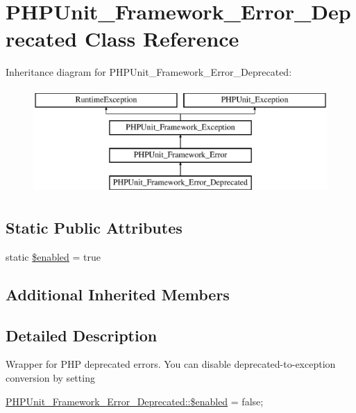\hypertarget{class_p_h_p_unit___framework___error___deprecated}{}\section{P\+H\+P\+Unit\+\_\+\+Framework\+\_\+\+Error\+\_\+\+Deprecated Class Reference}
\label{class_p_h_p_unit___framework___error___deprecated}
Inheritance diagram for P\+H\+P\+Unit\+\_\+\+Framework\+\_\+\+Error\+\_\+\+Deprecated\+:\begin{figure}[H]
\begin{center}
\leavevmode
\includegraphics[height=4.000000cm]{class_p_h_p_unit___framework___error___deprecated}
\end{center}
\end{figure}
\subsection*{Static Public Attributes}
\begin{DoxyCompactItemize}
\item 
static \mbox{\hyperlink{class_p_h_p_unit___framework___error___deprecated_a8d376199cc641e3e7af6e1a0d5c736d9}{\$enabled}} = true
\end{DoxyCompactItemize}
\subsection*{Additional Inherited Members}


\subsection{Detailed Description}
Wrapper for P\+HP deprecated errors. You can disable deprecated-\/to-\/exception conversion by setting

{\ttfamily  \mbox{\hyperlink{class_p_h_p_unit___framework___error___deprecated_a8d376199cc641e3e7af6e1a0d5c736d9}{P\+H\+P\+Unit\+\_\+\+Framework\+\_\+\+Error\+\_\+\+Deprecated\+::\$enabled}} = false; } 


